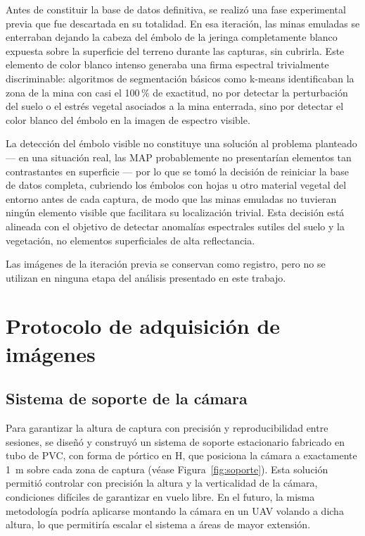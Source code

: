Antes de constituir la base de datos definitiva, se realizó una fase experimental
previa que fue descartada en su totalidad. En esa iteración, las minas
emuladas se enterraban dejando la cabeza del émbolo de la jeringa completamente blanco expuesta
sobre la superficie del terreno durante las capturas, sin cubrirla. Este
elemento de color blanco intenso generaba una firma espectral trivialmente
discriminable: algoritmos de segmentación básicos como k-means identificaban
la zona de la mina con casi el 100\,\% de exactitud, no por detectar la
perturbación del suelo o el estrés vegetal asociados a la mina enterrada,
sino por detectar el color blanco del émbolo en la imagen de espectro visible.

La detección del émbolo visible no constituye una solución al problema
planteado --- en una situación real, las \ac{MAP} probablemente no presentarían elementos
tan contrastantes en superficie --- por lo que se tomó la decisión de reiniciar
la base de datos completa, cubriendo los émbolos con hojas u otro material vegetal
del entorno antes de cada captura, de modo que las minas emuladas no tuvieran
ningún elemento visible que facilitara su localización trivial. Esta decisión
está alineada con el objetivo de detectar anomalías espectrales sutiles del
suelo y la vegetación, no elementos superficiales de alta reflectancia.

Las imágenes de la iteración previa se conservan como registro, pero no
se utilizan en ninguna etapa del análisis presentado en este trabajo.

\section{Protocolo de adquisición de imágenes}

\subsection{Sistema de soporte de la cámara}
\label{sec:montaje}

Para garantizar la altura de captura con precisión y reproducibilidad entre
sesiones, se diseñó y construyó un sistema de soporte estacionario fabricado
en tubo de \ac{PVC}, con forma de pórtico en H, que posiciona la cámara a
exactamente \SI{1}{m} sobre cada zona de captura
(véase Figura~\ref{fig:soporte}). Esta solución permitió controlar con
precisión la altura y la verticalidad de la cámara, condiciones difíciles
de garantizar en vuelo libre. En el futuro, la misma metodología podría
aplicarse montando la cámara en un \ac{UAV} volando a dicha altura, lo
que permitiría escalar el sistema a áreas de mayor extensión.

